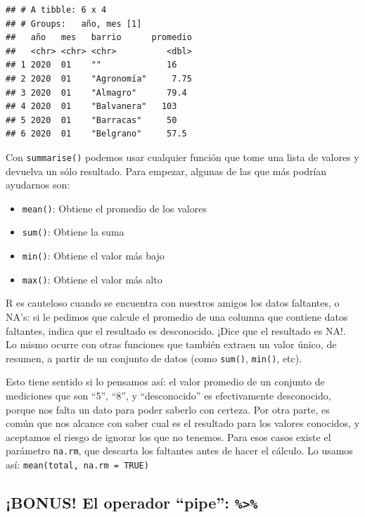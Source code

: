 \documentclass[
]{book}
\providecommand{\tightlist}{%
  \setlength{\itemsep}{0pt}\setlength{\parskip}{0pt}}
\begin{document}
\begin{verbatim}
## # A tibble: 6 x 4
## # Groups:   año, mes [1]
##   año   mes   barrio      promedio
##   <chr> <chr> <chr>          <dbl>
## 1 2020  01    ""             16   
## 2 2020  01    "Agronomía"     7.75
## 3 2020  01    "Almagro"      79.4 
## 4 2020  01    "Balvanera"   103   
## 5 2020  01    "Barracas"     50   
## 6 2020  01    "Belgrano"     57.5
\end{verbatim}

Con \texttt{summarise()} podemos usar cualquier función que tome una lista de valores y devuelva un sólo resultado. Para empezar, algunas de las que más podrían ayudarnos son:

\begin{itemize}
\tightlist
\item
  \texttt{mean()}: Obtiene el promedio de los valores
\item
  \texttt{sum()}: Obtiene la suma
\item
  \texttt{min()}: Obtiene el valor más bajo
\item
  \texttt{max()}: Obtiene el valor más alto
\end{itemize}

R es cauteloso cuando se encuentra con nuestros amigos los datos faltantes, o NA's: si le pedimos que calcule el promedio de una columna que contiene datos faltantes, indica que el resultado es desconocido. ¡Dice que el resultado es NA!. Lo mismo ocurre con otras funciones que también extraen un valor único, de resumen, a partir de un conjunto de datos (como \texttt{sum()}, \texttt{min()}, etc).

Esto tiene sentido si lo pensamos así: el valor promedio de un conjunto de mediciones que son ``5'', ``8'', y ``desconocido'' es efectivamente desconocido, porque nos falta un dato para poder saberlo con certeza. Por otra parte, es común que nos alcance con saber cual es el resultado para los valores conocidos, y aceptamos el riesgo de ignorar los que no tenemos. Para esos casos existe el parámetro \texttt{na.rm}, que descarta los faltantes antes de hacer el cálculo. Lo usamos así: \texttt{mean(total,\ na.rm\ =\ TRUE)}

\hypertarget{bonus-el-operador-pipe}{%
\subsection{\texorpdfstring{¡BONUS! El operador ``pipe'': \texttt{\%\textgreater{}\%}}{¡BONUS! El operador ``pipe'': \%\textgreater\%}}\label{bonus-el-operador-pipe}}
\end{document}
